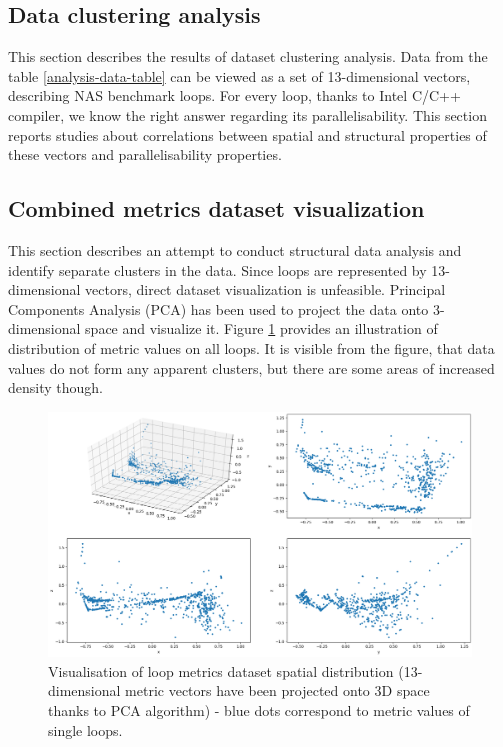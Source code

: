 \subsection{Data clustering analysis}
\label{analysis-data-clustering-analysis}
\qquad This section describes the results of dataset clustering analysis. Data from the table \ref{analysis-data-table} can be viewed as a set of 13-dimensional vectors, describing NAS benchmark loops. For every loop, thanks to Intel C/C++ compiler, we know the right answer regarding its parallelisability. This section reports studies about correlations between spatial and structural properties of these vectors and parallelisability properties.    

\subsection{Combined metrics dataset visualization}
\label{analysis-data-clustering-analysis}
\qquad This section describes an attempt to conduct structural data analysis and identify separate clusters in the data. Since loops are represented by 13-dimensional vectors, direct dataset visualization is unfeasible. Principal Components Analysis (PCA) has been used to project the data onto 3-dimensional space and visualize it. Figure \ref{metrics-pca-13-to-3} provides an illustration of distribution of metric values on all loops. It is visible from the figure, that data values do not form any apparent clusters, but there are some areas of increased density though.
\begin{figure}[htb]
\centering
\includegraphics[width=\linewidth]{figs/metrics-pca-13-to-3.png}
\caption{Visualisation of loop metrics dataset spatial distribution (13-dimensional metric vectors have been projected onto 3D space thanks to PCA algorithm) - blue dots correspond to metric values of single loops.}
\label{metrics-pca-13-to-3}
\end{figure} \newline 
